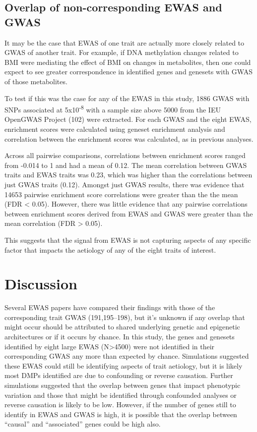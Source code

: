 \documentclass[11pt,oneside]{bristolthesis}
\begin{document}
\hypertarget{matching-gwas-to-ewas}{%
\subsection{Overlap of non-corresponding EWAS and GWAS}\label{matching-gwas-to-ewas}}

It may be the case that EWAS of one trait are actually more closely related to GWAS of another trait. For example, if DNA methylation changes related to BMI were mediating the effect of BMI on changes in metabolites, then one could expect to see greater correspondence in identified genes and genesets with GWAS of those metabolites.

To test if this was the case for any of the EWAS in this study, 1886 GWAS with SNPs associated at 5x10\textsuperscript{-8} with a sample size above 5000 from the IEU OpenGWAS Project (102) were extracted. For each GWAS and the eight EWAS, enrichment scores were calculated using geneset enrichment analysis and correlation between the enrichment scores was calculated, as in previous analyses.

Across all pairwise comparisons, correlations between enrichment scores ranged from -0.014 to 1 and had a mean of 0.12. The mean correlation between GWAS traits and EWAS traits was 0.23, which was higher than the correlations between just GWAS traits (0.12). Amongst just GWAS results, there was evidence that 14653 pairwise enrichment score correlations were greater than the the mean (FDR \textless{} 0.05). However, there was little evidence that any pairwise correlations between enrichment scores derived from EWAS and GWAS were greater than the mean correlation (FDR \textgreater{} 0.05).

This suggests that the signal from EWAS is not capturing aspects of any specific factor that impacts the aetiology of any of the eight traits of interest.

\hypertarget{discussion-06}{%
\section{Discussion}\label{discussion-06}}

Several EWAS papers have compared their findings with those of the corresponding trait GWAS (191,195--198), but it's unknown if any overlap that might occur should be attributed to shared underlying genetic and epigenetic architectures or if it occurs by chance. In this study, the genes and genesets identified by eight large EWAS (N\textgreater4500) were not identified in their corresponding GWAS any more than expected by chance. Simulations suggested these EWAS could still be identifying aspects of trait aetiology, but it is likely most DMPs identified are due to confounding or reverse causation. Further simulations suggested that the overlap between genes that impact phenotypic variation and those that might be identified through confounded analyses or reverse causation is likely to be low. However, if the number of genes still to identify in EWAS and GWAS is high, it is possible that the overlap between ``causal'' and ``associated'' genes could be high also.
\end{document}
